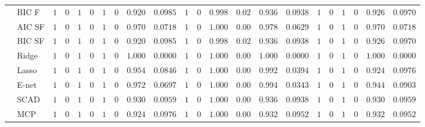 \begin{tabular}{ll|ll|llllll|llllll|llllll}
 & BIC F  & $1$ & $0$ & $1$ & $0$ & $1$ & $0$ & $0.920$ & $0.0985$ & $1$ & $0$ & $0.998$ & $0.02$ & $0.936$ & $0.0938$ & $1$ & $0$ & $1$ & $0$ & $0.926$ & $0.0970$ \\
 & AIC SF  & $1$ & $0$ & $1$ & $0$ & $1$ & $0$ & $0.970$ & $0.0718$ & $1$ & $0$ & $1.000$ & $0.00$ & $0.978$ & $0.0629$ & $1$ & $0$ & $1$ & $0$ & $0.970$ & $0.0718$ \\
 & BIC SF  & $1$ & $0$ & $1$ & $0$ & $1$ & $0$ & $0.920$ & $0.0985$ & $1$ & $0$ & $0.998$ & $0.02$ & $0.936$ & $0.0938$ & $1$ & $0$ & $1$ & $0$ & $0.926$ & $0.0970$ \\
 & Ridge  & $1$ & $0$ & $1$ & $0$ & $1$ & $0$ & $1.000$ & $0.0000$ & $1$ & $0$ & $1.000$ & $0.00$ & $1.000$ & $0.0000$ & $1$ & $0$ & $1$ & $0$ & $1.000$ & $0.0000$ \\
 & Lasso  & $1$ & $0$ & $1$ & $0$ & $1$ & $0$ & $0.954$ & $0.0846$ & $1$ & $0$ & $1.000$ & $0.00$ & $0.992$ & $0.0394$ & $1$ & $0$ & $1$ & $0$ & $0.924$ & $0.0976$ \\
 & E-net  & $1$ & $0$ & $1$ & $0$ & $1$ & $0$ & $0.972$ & $0.0697$ & $1$ & $0$ & $1.000$ & $0.00$ & $0.994$ & $0.0343$ & $1$ & $0$ & $1$ & $0$ & $0.944$ & $0.0903$ \\
 & SCAD  & $1$ & $0$ & $1$ & $0$ & $1$ & $0$ & $0.930$ & $0.0959$ & $1$ & $0$ & $1.000$ & $0.00$ & $0.936$ & $0.0938$ & $1$ & $0$ & $1$ & $0$ & $0.930$ & $0.0959$ \\
 & MCP  & $1$ & $0$ & $1$ & $0$ & $1$ & $0$ & $0.924$ & $0.0976$ & $1$ & $0$ & $1.000$ & $0.00$ & $0.932$ & $0.0952$ & $1$ & $0$ & $1$ & $0$ & $0.932$ & $0.0952$ \\
\hline 
\end{tabular}

